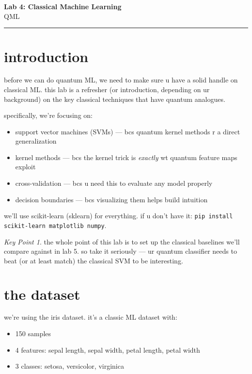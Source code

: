 \documentclass[11pt,a4paper]{article}
\theoremstyle{definition}
\theoremstyle{remark}
\newtheorem*{keypoint}{Key Point}
\begin{document}
{\LARGE \textbf{Lab 4: Classical Machine Learning}}\\[8pt]
{\large QML}\\[12pt]
\hrule

\vspace{16pt}

\section{introduction}

before we can do quantum ML, we need to make sure u have a solid handle on classical ML. this lab is a refresher (or introduction, depending on ur background) on the key classical techniques that have quantum analogues.

specifically, we're focusing on:
\begin{itemize}[leftmargin=*]
  \item support vector machines (SVMs) --- bcs quantum kernel methods r a direct generalization
  \item kernel methods --- bcs the kernel trick is \textit{exactly} wt quantum feature maps exploit
  \item cross-validation --- bcs u need this to evaluate any model properly
  \item decision boundaries --- bcs visualizing them helps build intuition
\end{itemize}

we'll use scikit-learn (sklearn) for everything. if u don't have it: \texttt{pip install scikit-learn matplotlib numpy}.

\begin{keypoint}
the whole point of this lab is to set up the classical baselines we'll compare against in lab 5. so take it seriously --- ur quantum classifier needs to beat (or at least match) the classical SVM to be interesting.
\end{keypoint}

\section{the dataset}

we're using the iris dataset. it's a classic ML dataset with:
\begin{itemize}[leftmargin=*]
  \item 150 samples
  \item 4 features: sepal length, sepal width, petal length, petal width
  \item 3 classes: setosa, versicolor, virginica
\end{itemize}
\end{document}
